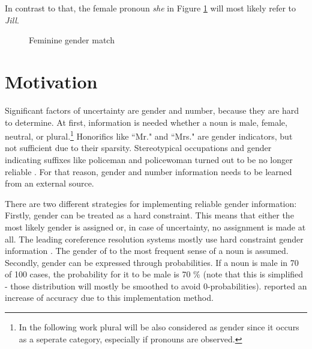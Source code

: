 In contrast to that, the female pronoun \textit{she} in Figure \ref{figure:femmatch} will most likely refer to \textit{Jill}.


\begin{figure}[h]
\centering\sffamily
\caption{Feminine gender match}
	\label{figure:femmatch}
\end{figure}


\section{Motivation}
\label{introductionMotivation}
Significant factors of uncertainty are gender and number, because they are hard to determine. At first, information is needed whether a noun is male, female, neutral, or plural.\footnote{In the following work plural will be also considered as gender since it occurs as a seperate category, especially if pronouns are observed.} Honorifics like ``Mr." and ``Mrs." are gender indicators, but not sufficient due to their sparsity. Stereotypical occupations and gender indicating suffixes like policeman and policewoman turned out to be no longer reliable \citep{evans2000improving}. For that reason, gender and number information needs to be learned from an external source. 

There are two different strategies for implementing reliable gender information: \\
Firstly, gender can be treated as a hard constraint. This means that either the most likely gender is assigned or, in case of uncertainty, no assignment is made at all. The leading coreference resolution systems mostly use hard constraint gender information \citep{soon2001machine}. The gender of to the most frequent sense of a noun is assumed.\\
Secondly, gender can be expressed through probabilities. If a noun is male in 70 of 100 cases, the probability for it to be male is 70 \% (note that this is simplified - those distribution will mostly be smoothed to avoid 0-probabilities). \cite{bergsma2005automatic} reported an increase of accuracy due to this implementation method.

